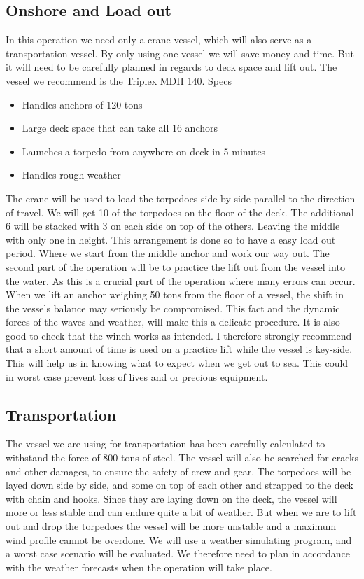 \documentclass[DIV=calc, paper=a4, fontsize=13pt, twocolumn]{scrartcl}	 %
\begin{document}
\subsection*{Onshore and Load out}
In this operation we need only a crane vessel, which will also serve as a transportation vessel. By only using one vessel we will save money and time. But it will need to be carefully planned in regards to deck space and lift out. The vessel we recommend is the Triplex MDH 140. Specs
\begin{itemize}
\item Handles anchors of 120 tons
\item Large deck space that can take all 16 anchors 
\item Launches a torpedo from anywhere on deck in 5 minutes
\item Handles rough weather
\end{itemize}
The crane will be used to load the torpedoes side by side parallel to the direction of travel. We will get 10 of the torpedoes on the floor of the deck. The additional 6 will be stacked with 3 on each side on top of the others. Leaving the middle with only one in height. This arrangement is done so to have a easy load out period. Where we start from the middle anchor and work our way out. 
\newline
The second part of the operation will be to practice the lift out from the vessel into the water. As this is a crucial part of the operation where many errors can occur. When we lift an anchor weighing 50 tons from the floor of a vessel, the shift in the vessels balance may seriously be compromised. This fact and the dynamic forces of the waves and weather, will make this a delicate procedure. It is also good to check that the winch works as intended. 
\newline
I therefore strongly recommend that a short amount of time is used on a practice lift while the vessel is key-side. This will help us in knowing what to expect when we get out to sea. This could in worst case prevent loss of lives and or precious equipment.



\subsection*{Transportation}
The vessel we are using for transportation has been carefully calculated to withstand the force of 800 tons of steel. The vessel will also be searched for cracks and other damages, to ensure the safety of crew and gear. The torpedoes will be layed down side by side, and some on top of each other and strapped to the deck with chain and hooks. Since they are laying down on the deck, the vessel will more or less stable and can endure quite a bit of weather. But when we are to lift out and drop the torpedoes the vessel will be more unstable and a maximum wind profile cannot be overdone. We will use a weather simulating program, and a worst case scenario will be evaluated. We therefore need to plan in accordance with the weather forecasts when the operation will take place. 
\end{document}
